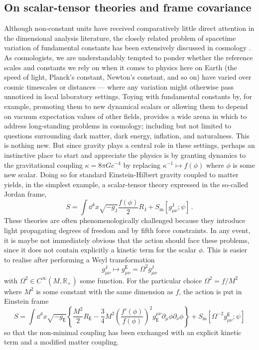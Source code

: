 \documentclass[12pt]{article}
\numberwithin{equation}{section}
\newcommand{\R}{\mathbb{R}}
\begin{document}
\subsection{On scalar-tensor theories and frame covariance}\label{sec:scalartensor}

Although non-constant units have received comparatively little direct attention in the dimensional analysis literature, the closely related problem of spacetime variation of fundamental constants has been extensively discussed in cosmology \citep{Uzan2025}. As cosmologists, we are understandably tempted to ponder whether the reference scales and constants we rely on when it comes to physics here on Earth (the speed of light, Planck's constant, Newton's constant, and so on) have varied over cosmic timescales or distances --- where any variation might otherwise pass unnoticed in local laboratory settings. Toying with fundamental constants by, for example, promoting them to new dynamical scalars or allowing them to depend on vacuum expectation values of other fields, provides a wide arena in which to address long-standing problems in cosmology; including but not limited to questions surrounding dark matter, dark energy, inflation, and naturalness. This is nothing new. But since gravity plays a central role in these settings, perhaps an instinctive place to start and appreciate the physics is by granting dynamics to the gravitational coupling $\kappa=8\pi Gc^{-4}$ by replacing $\kappa^{-1}\mapsto f(\phi)$ where $\phi$ is some new scalar. Doing so for standard Einstein-Hilbert gravity coupled to matter yields, in the simplest example, a scalar-tensor theory expressed in the so-called Jordan frame,
\begin{equation}\label{eq:Jordanframe}
    S = \int \dd^4x \sqrt{-g_\mathsf{J}} \frac{f(\phi)}{2}R_\mathsf{J} + S_\text{m}[g^\mathsf{J}_{\mu\nu};\psi]\,.
\end{equation}
These theories are often phenomenologically challenged because they introduce light propagating degrees of freedom and by fifth force constraints. In any event, it is maybe not immediately obvious that the action should face these problems, since it does not contain explicitly a kinetic term for the scalar $\phi$. This is easier to realise after performing a Weyl transformation
\begin{equation}
    g^\mathsf{J}_{\mu\nu}\longmapsto g^\mathsf{E}_{\mu\nu} = \Omega^2g^\mathsf{J}_{\mu\nu}
\end{equation}
with $\Omega^2\in C^\infty(M,\R_+)$ some function. For the particular choice $\Omega^2 = f/M^2$ where $M^2$ is some constant with the same dimension as $f$, the action is put in Einstein frame
\begin{equation}\label{eq:Einsteinframe}
    S = \int \dd^4x \sqrt{-g_\mathsf{E}} \left\{ \frac{M^2}{2}R_\mathsf{E}- \frac{3}{4}M^2\left(\frac{f'(\phi)}{f(\phi)}\right)^2 g_\mathsf{E}^{\mu\nu}\partial_\mu \phi\partial_\nu \phi\right\} + S_\text{m}[\Omega^{-2}g^\mathsf{E}_{\mu\nu};\psi]
\end{equation}
so that the non-minimal coupling has been exchanged with an explicit kinetic term and a modified matter coupling.
\end{document}
